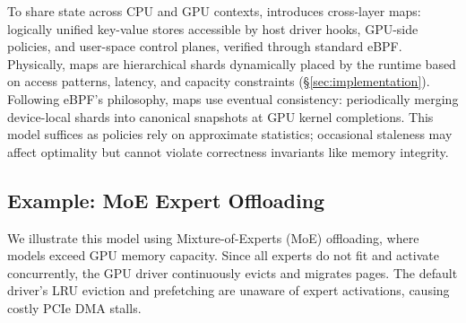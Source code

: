 To share state across CPU and GPU contexts, \sys{} introduces cross-layer maps: logically unified key-value stores accessible by host driver hooks, GPU-side policies, and user-space control planes, verified through standard eBPF.
Physically, maps are hierarchical shards dynamically placed by the runtime based on access patterns, latency, and capacity constraints (\S\ref{sec:implementation}).
Following eBPF's philosophy, \sys{} maps use eventual consistency: periodically merging device-local shards into canonical snapshots at GPU kernel completions.
This model suffices as policies rely on approximate statistics; occasional staleness may affect optimality but cannot violate correctness invariants like memory integrity.

\subsection{Example: MoE Expert Offloading}

We illustrate this model using Mixture-of-Experts (MoE) offloading, where models exceed GPU memory capacity.
Since all experts do not fit and activate concurrently, the GPU driver continuously evicts and migrates pages.
The default driver's LRU eviction and prefetching are unaware of expert activations, causing costly PCIe DMA stalls.

